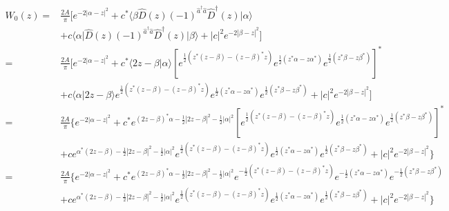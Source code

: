 \begin{align*}
  W_0(z) = & \frac{2A}{\pi} \bigg[ e^{-2|\alpha - z|^2} + c^* \langle \beta \hat{D}(z) (-1)^{\hat{a}^\dagger \hat{a}} \hat{D}^\dagger(z) \vert\alpha\rangle                                                                                                                          \\ & + c \langle \alpha\vert \hat{D}(z) (-1)^{\hat{a}^\dagger \hat{a}} \hat{D}^\dagger(z) \vert\beta\rangle + |c|^2 e^{-2|\beta - z|^2} \bigg] \\ = & \frac{2A}{\pi} \bigg[ e^{-2|\alpha - z|^2} + c^* \langle 2z-\beta \vert \alpha \rangle \left[ e^{\frac{1}{2}(z^*(z-\beta) - (z-\beta)^* z)} e^{\frac{1}{2}(z^*\alpha - z \alpha^*)} e^{\frac{1}{2}(z^*\beta - z \beta^*)}\right]^* \\ & + c \langle \alpha \vert 2z - \beta\rangle e^{\frac{1}{2}(z^*(z-\beta) - (z-\beta)^* z)} e^{\frac{1}{2}(z^*\alpha - z \alpha^*)} e^{\frac{1}{2}(z^*\beta - z \beta^*)} + |c|^2 e^{-2|\beta - z|^2} \bigg] \\
  =        & \frac{2A}{\pi} \bigg\{ e^{-2|\alpha - z|^2} + c^* e^{(2z-\beta)^*\alpha - \frac{1}{2}|2z-\beta|^2 - \frac{1}{2}|\alpha|^2}  \left[ e^{\frac{1}{2}(z^*(z-\beta) - (z-\beta)^* z)} e^{\frac{1}{2}(z^*\alpha - z \alpha^*)} e^{\frac{1}{2}(z^*\beta - z \beta^*)}\right]^* \\ & + c e^{\alpha^*(2z-\beta) - \frac{1}{2}|2z-\beta|^2 - \frac{1}{2}|\alpha|^2} e^{\frac{1}{2}(z^*(z-\beta) - (z-\beta)^* z)} e^{\frac{1}{2}(z^*\alpha - z \alpha^*)} e^{\frac{1}{2}(z^*\beta - z \beta^*)} + |c|^2 e^{-2|\beta - z|^2} \bigg\} \\
  =        & \frac{2A}{\pi} \bigg\{ e^{-2|\alpha - z|^2} + c^* e^{(2z-\beta)^*\alpha - \frac{1}{2}|2z-\beta|^2 - \frac{1}{2}|\alpha|^2} e^{-\frac{1}{2}(z^*(z-\beta) - (z-\beta)^* z)} e^{-\frac{1}{2}(z^*\alpha - z \alpha^*)} e^{-\frac{1}{2}(z^*\beta - z \beta^*)}               \\ & + c e^{\alpha^*(2z-\beta) - \frac{1}{2}|2z-\beta|^2 - \frac{1}{2}|\alpha|^2} e^{\frac{1}{2}(z^*(z-\beta) - (z-\beta)^* z)} e^{\frac{1}{2}(z^*\alpha - z \alpha^*)} e^{\frac{1}{2}(z^*\beta - z \beta^*)} + |c|^2 e^{-2|\beta - z|^2} \bigg\}
\end{align*}

